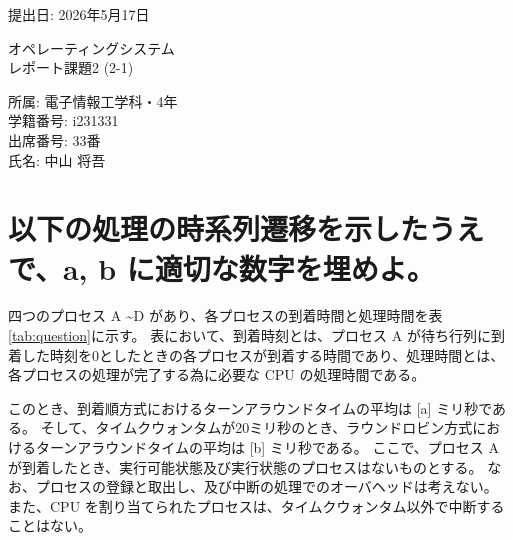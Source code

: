\documentclass[a4paper,11pt,openany]{ltjsreport}
\begin{document}
\setcounter{page}{1}


% 

\begin{titlepage}
	\begin{flushright}
		\large{提出日: 2026年5月17日}
	\end{flushright}
	\begin{center}
		{\huge オペレーティングシステム} \\
		{\vspace{1cm}}
		{\huge レポート課題2 (2-1)}
	\end{center}
	\begin{center}
		{\large 所属: 電子情報工学科・4年} \\
		\vspace{0.5cm}
		{\large 学籍番号: i231331} \\
		\vspace{0.5cm}
		{\large 出席番号: 33番} \\
		\vspace{0.5cm}
		{\large 氏名: 中山 将吾}
	\end{center}
\end{titlepage}

\section{以下の処理の時系列遷移を示したうえで、a, b に適切な数字を埋めよ。}
四つのプロセス A \textasciitilde D があり、各プロセスの到着時間と処理時間を表\ref{tab:question}に示す。
表において、到着時刻とは、プロセス A が待ち行列に到着した時刻を0としたときの各プロセスが到着する時間であり、処理時間とは、各プロセスの処理が完了する為に必要な CPU の処理時間である。

このとき、到着順方式におけるターンアラウンドタイムの平均は [a] ミリ秒である。
そして、タイムクウォンタムが20ミリ秒のとき、ラウンドロビン方式におけるターンアラウンドタイムの平均は [b] ミリ秒である。
ここで、プロセス A が到着したとき、実行可能状態及び実行状態のプロセスはないものとする。
なお、プロセスの登録と取出し、及び中断の処理でのオーバヘッドは考えない。
また、CPU を割り当てられたプロセスは、タイムクウォンタム以外で中断することはない。
\end{document}
